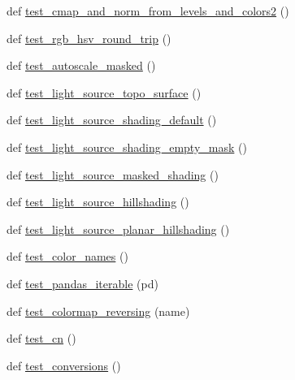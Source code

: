 \begin{DoxyCompactItemize}
\item 
def \hyperlink{namespacematplotlib_1_1tests_1_1test__colors_aa9c7c5b7ff067b7b237bf393f61033ec}{test\+\_\+cmap\+\_\+and\+\_\+norm\+\_\+from\+\_\+levels\+\_\+and\+\_\+colors2} ()
\item 
def \hyperlink{namespacematplotlib_1_1tests_1_1test__colors_ae4d405bb1a01bb9072a95b7497dc2d7a}{test\+\_\+rgb\+\_\+hsv\+\_\+round\+\_\+trip} ()
\item 
def \hyperlink{namespacematplotlib_1_1tests_1_1test__colors_a7167f8914fdc12ef256eb488ba02f43e}{test\+\_\+autoscale\+\_\+masked} ()
\item 
def \hyperlink{namespacematplotlib_1_1tests_1_1test__colors_ad52d347ea6af9500ae2b7d063bc4ae36}{test\+\_\+light\+\_\+source\+\_\+topo\+\_\+surface} ()
\item 
def \hyperlink{namespacematplotlib_1_1tests_1_1test__colors_a38586c8d0473fa44b65739f22dab0552}{test\+\_\+light\+\_\+source\+\_\+shading\+\_\+default} ()
\item 
def \hyperlink{namespacematplotlib_1_1tests_1_1test__colors_a852245b9fe24b436b3856b211383501f}{test\+\_\+light\+\_\+source\+\_\+shading\+\_\+empty\+\_\+mask} ()
\item 
def \hyperlink{namespacematplotlib_1_1tests_1_1test__colors_a2a4f294c756cc19fc93f1f357ddd428e}{test\+\_\+light\+\_\+source\+\_\+masked\+\_\+shading} ()
\item 
def \hyperlink{namespacematplotlib_1_1tests_1_1test__colors_a84af901c7dc480f9852f2e710667ba77}{test\+\_\+light\+\_\+source\+\_\+hillshading} ()
\item 
def \hyperlink{namespacematplotlib_1_1tests_1_1test__colors_a9301b35eba437e8f2085b8c536da0b53}{test\+\_\+light\+\_\+source\+\_\+planar\+\_\+hillshading} ()
\item 
def \hyperlink{namespacematplotlib_1_1tests_1_1test__colors_a05939b42cac8de4f85785695102df5b9}{test\+\_\+color\+\_\+names} ()
\item 
def \hyperlink{namespacematplotlib_1_1tests_1_1test__colors_ad4525f407aa40733f1127fc7d345d6d9}{test\+\_\+pandas\+\_\+iterable} (pd)
\item 
def \hyperlink{namespacematplotlib_1_1tests_1_1test__colors_a96bb0af8109ee2ea050feed8890634ae}{test\+\_\+colormap\+\_\+reversing} (name)
\item 
def \hyperlink{namespacematplotlib_1_1tests_1_1test__colors_ae60a8bb36ca1a74649e883a83f1f03a0}{test\+\_\+cn} ()
\item 
def \hyperlink{namespacematplotlib_1_1tests_1_1test__colors_a6a0c77a21eb755f9a7ce717805c0ae95}{test\+\_\+conversions} ()

\end{DoxyCompactItemize}
